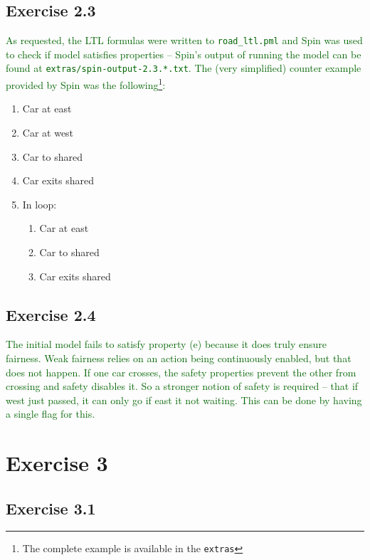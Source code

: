 \documentclass[12pt]{article}
\newcommand{\drafter}[1]{\textcolor{darkgreen}{#1}}
\begin{document}
\begin{enumerate}[label=\roman*.]
\begin{enumerate}[label=(\alph*)]
\end{enumerate}

\subsection*{Exercise 2.3}

\drafter{As requested, the LTL formulas were written to \texttt{road\_ltl.pml} and Spin was used to check if model satisfies properties -- Spin's output of running the model can be found at \texttt{extras/spin\allowbreak-output-2.3.*.txt}.}
\drafter{The (very simplified) counter example provided by Spin was the following\footnote{The complete example is available in the \texttt{extras}}:}

\begin{enumerate}
  \item Car at east
  \item Car at west
  \item Car to shared
  \item Car exits shared
  \item In loop:
  \begin{enumerate}[label=\theenumi.\arabic*.]
    \item Car at east
    \item Car to shared
    \item Car exits shared
  \end{enumerate}
\end{enumerate}

\subsection*{Exercise 2.4}

\drafter{The initial model fails to satisfy property (e) because it does truly ensure fairness.}
\drafter{Weak fairness relies on an action being continuously enabled, but that does not happen.}
\drafter{If one car crosses, the safety properties prevent the other from crossing and safety disables it.}
\drafter{So a stronger notion of safety is required -- that if west just passed, it can only go if east it not waiting.}
\drafter{This can be done by having a single flag for this.}

\section*{Exercise 3}

\subsection*{Exercise 3.1}


\end{enumerate}
\end{document}
